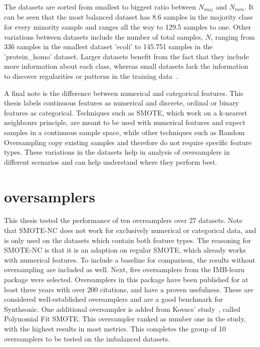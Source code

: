The datasets are sorted from smallest to biggest ratio between $N_{maj}$ and $N_{min}$. It can be seen that the most balanced dataset has 8.6 samples in the majority class for every minority sample and ranges all the way to 129.5 samples to one. Other variations between datasets include the number of total samples, $N$, ranging from 336 samples in the smallest dataset 'ecoli' to 145.751 samples in the 'protein\_homo' dataset. Larger datasets benefit from the fact that they include more information about each class, whereas small datasets lack the information to discover regularities or patterns in the training data~\cite{Ali2013ClassificationReview}.

A final note is the difference between numerical and categorical features. This thesis labels continuous features as numerical and discrete, ordinal or binary features as categorical. Techniques such as SMOTE, which work on a k-nearest neighbours principle, are meant to be used with numerical features and expect samples in a continuous sample space, while other techniques such as Random Oversampling copy existing samples and therefore do not require specific feature types. These variations in the datasets help in analysis of oversamplers in different scenarios and can help understand where they perform best.

\section{oversamplers}
This thesis tested the performance of ten oversamplers over 27 datasets. Note that SMOTE-NC does not work for exclusively numerical or categorical data, and is only used on the datasets which contain both feature types. The reasoning for SMOTE-NC is that it is an adaption on regular SMOTE, which already works with numerical features. To include a baseline for comparison, the results without oversampling are included as well. Next, five oversamplers from the IMB-learn package were selected. Oversamplers in this package have been published for at least three years with over 200 citations, and have a proven usefulness. These are considered well-established oversamplers and are a good benchmark for Synthsonic. One additional oversampler is added from Kovacs' study~\cite{Kovacs2019AnDatasets}, called Polynomial Fit SMOTE. This oversampler ranked as number one in the study, with the highest results in most metrics. This completes the group of 10 oversamplers to be tested on the imbalanced datasets. 

